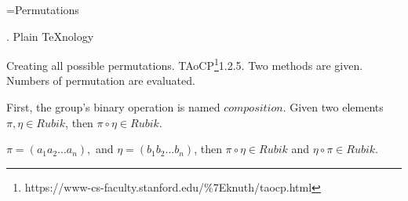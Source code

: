 
\def\a{\left(\matrix}
\def\b{\cr}
\def\c{\right)}

\def\d{\footnote*{http://web.mit.edu/sp.268/www/rubik.pdf}}
\def\f{\footnote*{https://www-cs-faculty.stanford.edu/\%7Eknuth/taocp.html}}
\def\e{\bigskip}
\def\R{{Rubik}}
\def\*{\circ}

\vsize=300pt %
\hsize=480pt %
\footline={\tenrm Permutations\quad\dotfill\quad \folio}

. Plain \TeX nology %

\e
Creating all possible permutations.  TAoCP\f 1.2.5.
Two methods are given.  Numbers of permutation are evaluated.

\e
First, the group's binary operation is named $composition$.
Given two elements $\pi,\eta\in\R$, then
$\pi\*\eta\in\R$.

\e
$\pi=(a_1 a_2 ... a_n),$ and $\eta=(b_1 b_2 ... b_n)$, then
$\pi\*\eta\in\R$ and $\eta\*\pi\in\R.$

\bye
